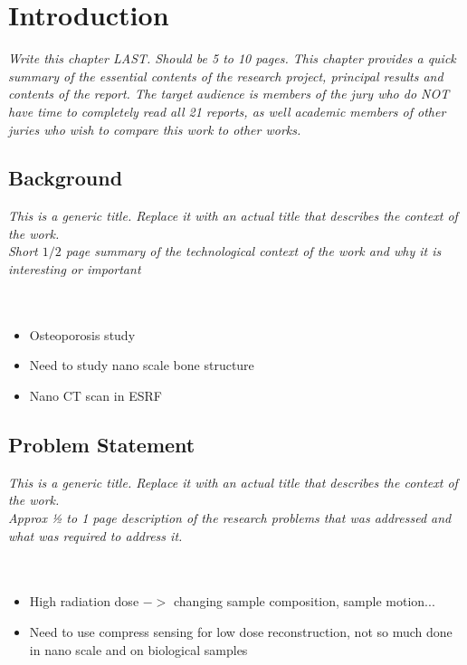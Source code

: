 \chapter{Introduction}

\textit{Write this chapter LAST.  Should be 5 to 10 pages.  This chapter provides a quick summary of the essential contents of the research project, principal results and contents of the report.  The target audience is members of the jury who do NOT have time to completely read all 21 reports, as well academic members of other juries who wish to compare this work to other works. }

\section{Background}
\textit{This is a generic title. Replace it with an actual title that describes the context of the work.\\
Short $1/2$ page summary of the technological context of the work and why it is interesting or important}\\
\\
\\
\begin{itemize}
	\item 	Osteoporosis study
	\item 	Need to study nano scale bone structure
	\item 	Nano CT scan in ESRF
\end{itemize}



\section{Problem Statement}
\textit{This is a generic title. Replace it with an actual title that describes the context of the work.\\
Approx ½ to 1 page description of the research problems that was addressed and what was required to address it. }\\
\\
\\
\begin{itemize}
	\item 	High radiation dose $->$ changing sample composition, sample motion...
	\item 	Need to use compress sensing for low dose reconstruction, not so much done in nano scale and on biological samples
\end{itemize}

